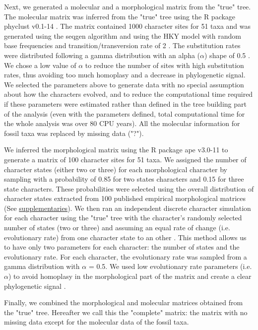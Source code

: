 \documentclass[12pt,letterpaper]{article}
\begin{document}
Next, we generated a molecular and a morphological matrix from the "true" tree.
The molecular matrix was inferred from the "true" tree using the R package phyclust v0.1-14 \citep{chen2011}.
The matrix contained 1000 character sites for 51 taxa and was generated using the seqgen algorithm \citep{ranbaut1997seqgen} and using the HKY model \citep{HKY85} with random base frequencies and transition/transversion rate of 2 \citep{douadycomparison2003}.
The substitution rates were distributed following a gamma distribution with an alpha ($\alpha$) shape of 0.5 \citep{yangamong-site1996}.
We chose a low value of $\alpha$ to reduce the number of sites with high substitution rates, thus avoiding too much homoplasy and a decrease in phylogenetic signal.
We selected the parameters above to generate data with no special assumption about how the characters evolved, and to reduce the computational time required if these parameters were estimated rather than defined in the tree building part of the analysis (even with the parameters defined, total computational time for the whole analysis was over 80 CPU years).
All the molecular information for fossil taxa was replaced by missing data ("?").

We inferred the morphological matrix using the R package ape v3.0-11 \citep{paradisape:2004} to generate a matrix of 100 character sites for 51 taxa.
We assigned the number of character states (either two or three) for each morphological character by sampling with a probability of 0.85 for two states characters and 0.15 for three state characters.
These probabilities were selected using the overall distribution of character states extracted from 100 published empirical morphological matrices (See \hyperref[supplementaries]{supplementaries}).
We then ran an independent discrete character simulation for each character using the "true" tree with the character's randomly selected number of states (two or three) and assuming an equal rate of change (i.e. evolutionary rate) from one character state to an other \citep{Pagel22011994}.
This method allows us to have only two parameters for each character: the number of states and the evolutionary rate.
For each character, the evolutionary rate was sampled from a gamma distribution with $\alpha$ = 0.5.
We used low evolutionary rate parameters (i.e. $\alpha$) to avoid homoplasy in the morphological part of the matrix and create a clear phylogenetic signal \citep{wagner2000,davalosintegrating2014}.

Finally, we combined the morphological and molecular matrices obtained from the "true" tree.
Hereafter we call this the "complete" matrix: the matrix with no missing data except for the molecular data of the fossil taxa.
\end{document}
